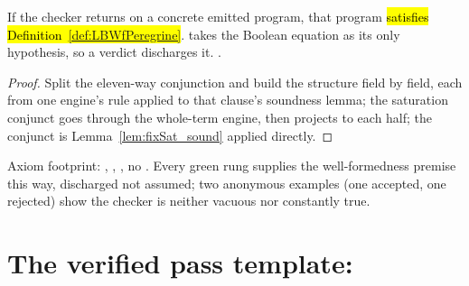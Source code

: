 \begin{theorem}
\label{thm:lbWfPeregrine_of_check}
\leanok
{}
 If the checker returns  on a concrete emitted program, that program
\hl{satisfies Definition~\ref{def:LBWfPeregrine}}.
 takes the Boolean equation as its only hypothesis, so a  verdict discharges
it.
 \stProved{}.
\end{theorem}
\begin{proof}
\leanok
{}
 Split the eleven-way conjunction and build the structure field by field, each from one
engine's rule applied to that clause's soundness lemma; the saturation conjunct goes through the
whole-term engine, then projects to each half; the  conjunct is
Lemma~\ref{lem:fixSat_sound} applied directly.
\end{proof}

\begin{remark}
 Axiom footprint: , , , no
. Every green rung supplies the well-formedness premise this way, discharged not assumed;
two anonymous examples (one accepted, one rejected) show the checker is neither vacuous nor constantly
true.
\end{remark}

\section{The verified pass template: \texorpdfstring{}{optimize}}
\label{sec:lowering:optimize}

